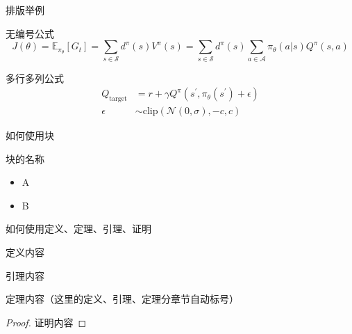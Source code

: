 \documentclass[aspectratio=169]{beamer}
\begin{document}
\begin{frame}{排版举例}
	
	\begin{textbox}{无编号公式}
        \begin{equation*}
            J(\theta) = \mathbb{E}_{\pi_\theta}[G_t] = \sum_{s\in\mathcal{S}} d^\pi (s)V^\pi(s)=\sum_{s\in\mathcal{S}} d^\pi(s)\sum_{a\in\mathcal{A}}\pi_\theta(a|s)Q^\pi(s,a)
        \end{equation*}
    \end{textbox}
    \begin{textbox}{多行多列公式\footnotemark[1]}
        \begin{align}
            Q_\mathrm{target}&=r+\gamma Q^\pi(s^\prime, \pi_\theta(s^\prime)+\epsilon)\\
            \epsilon&\sim\mathrm{clip}(\mathcal{N}(0, \sigma), -c, c)\nonumber
        \end{align}
    \end{textbox}
\end{frame}


\begin{frame}{如何使用块}
\begin{block}{块的名称}
	\begin{itemize}
        \item A
        \item B
    \end{itemize}
\end{block}	
\end{frame}

\begin{frame}{如何使用定义、定理、引理、证明}

\kaishu
\begin{define}[定义名称]
	定义内容
\end{define}

\begin{lem}[引理名称]
	引理内容
\end{lem}

\begin{thm}[定理名称]
	定理内容（这里的定义、引理、定理分章节自动标号）
\end{thm}

\begin{proof}
	证明内容
\end{proof}

\end{frame}
\end{document}
